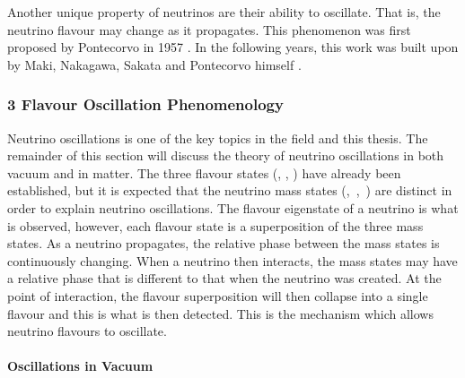Another unique property of neutrinos are their ability to oscillate. That is, the neutrino flavour may change as it propagates. This phenomenon was first proposed by Pontecorvo in 1957 \cite{Pontecorvo}. In the following years, this work was built upon by Maki, Nakagawa, Sakata and Pontecorvo himself \cite{MNS_oscillations}. 

\subsubsection{3 Flavour Oscillation Phenomenology}

Neutrino oscillations is one of the key topics in the field and this thesis. The remainder of this section will discuss the theory of neutrino oscillations in both vacuum and in matter. The three flavour states (\nue, \numu, \nutau) have already been established,
but it is expected that the neutrino mass states \mbox{(\nuone, \nutwo, \nuthree)} are distinct in order to explain neutrino oscillations. The flavour eigenstate of a neutrino is what is observed, however, each flavour state is a superposition of the three mass states. As a neutrino propagates, the relative phase between the mass states is continuously changing. When a neutrino then interacts, the mass states may have a relative phase that is different to that when the neutrino was created. At the point of interaction, the flavour superposition will then collapse into a single flavour and this is what is then detected. This is the mechanism which allows neutrino flavours to oscillate. 

\paragraph{Oscillations in Vacuum}



